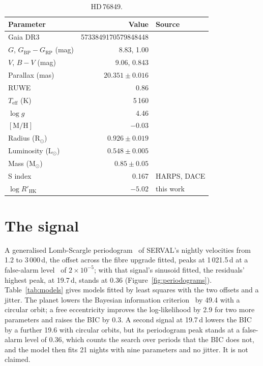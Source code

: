 \documentclass[3p,11pt]{elsarticle}
\newcommand{\Msun}{M$_\odot$}
\newcommand{\Rsun}{R$_\odot$}
\newcommand{\Lsun}{L$_\odot$}
\begin{document}
\begin{table}[!htbp]
\centering
\caption{HD\,76849.}\label{tab:star}
\begin{tabular}{l r l}
\toprule
Parameter & Value & Source \\
\midrule
Gaia DR3 & 5733849170579848448 & \cite{GaiaDR3} \\
$G$, $G_\mathrm{BP} - G_\mathrm{RP}$ (mag) & 8.83, 1.00 & \cite{GaiaDR3} \\
$V$, $B-V$ (mag) & 9.06, 0.843 & \cite{Perryman1997} \\
Parallax (mas) & $20.351 \pm 0.016$ & \cite{GaiaDR3} \\
RUWE & 0.86 & \cite{GaiaDR3} \\
$T_\mathrm{eff}$ (K) & 5\,160 & \cite{Creevey2023} \\
$\log g$ & 4.46 & \cite{Creevey2023} \\
$[\mathrm{M/H}]$ & $-0.03$ & \cite{Creevey2023} \\
Radius (\Rsun) & $0.926 \pm 0.019$ & \cite{Creevey2023} \\
Luminosity (\Lsun) & $0.548 \pm 0.005$ & \cite{Creevey2023} \\
Mass (\Msun) & $0.85 \pm 0.05$ & \cite{Pecaut2013} \\
S index & 0.167 & HARPS, DACE \\
$\log R'_\mathrm{HK}$ & $-5.02$ & this work \\
\bottomrule
\end{tabular}
\end{table}

\section{The signal}\label{sec:signal}

A generalised Lomb-Scargle periodogram~\cite{Zechmeister2009} of SERVAL's nightly velocities from 1.2 to
3\,000\,d, the offset across the fibre upgrade fitted, peaks at 1\,021.5\,d at a false-alarm
level~\cite{Baluev2008} of $2\times10^{-5}$; with that signal's sinusoid fitted, the residuals' highest
peak, at 19.7\,d, stands at 0.36 (Figure~\ref{fig:periodograms}). Table~\ref{tab:models} gives models
fitted by least squares with the two offsets and a jitter. The planet lowers the Bayesian information
criterion~\cite{Schwarz1978} by 49.4 with a circular orbit; a free eccentricity improves the
log-likelihood by 2.9 for two more parameters and raises the BIC by 0.3. A second signal at 19.7\,d
lowers the BIC by a further 19.6 with circular orbits, but its periodogram peak stands at a false-alarm
level of 0.36, which counts the search over periods that the BIC does not, and the model then fits 21
nights with nine parameters and no jitter. It is not claimed.
\end{document}
